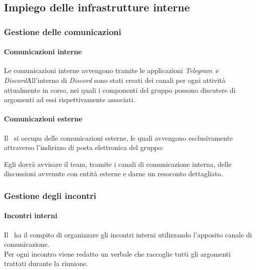   \subsection{Impiego delle infrastrutture interne} \label{subsection:infrastrutture_interne}

    \subsubsection{Gestione delle comunicazioni}
      \paragraph{Comunicazioni interne}
        Le comunicazioni interne avvengono tramite le applicazioni \textit{Telegram}\glo\ e \textit{Discord}\glo\. All'interno di \textit{Discord} sono stati creati dei canali per ogni attività attualmente in corso, nei quali i componenti del gruppo possono discutere di argomenti ad essi rispettivamente associati.
      
      \paragraph{Comunicazioni esterne}
        Il \roleProjectManager\ si occupa delle comunicazioni esterne, le quali avvengono esclusivamente attraverso l'indirizzo di posta elettronica del gruppo:\\
        \begin{center}
          \groupEmail
        \end{center}
        Egli dovrà avvisare il team, tramite i canali di comunicazione interna, delle discussioni avvenute con entità esterne e darne un resoconto dettagliato.

    \subsubsection{Gestione degli incontri}
      \paragraph{Incontri interni}
        Il \roleProjectManager\ ha il compito di organizzare gli incontri interni utilizzando l'apposito canale di comunicazione.\\
        Per ogni incontro viene redatto un verbale che raccoglie tutti gli argomenti trattati durante la riunione.

